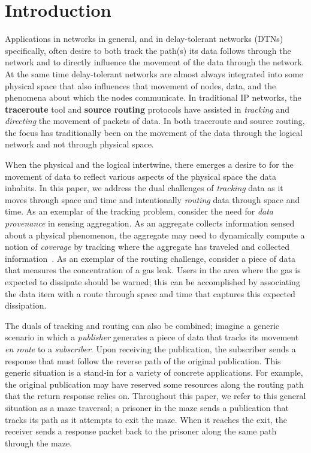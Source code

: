 %
%
\section{Introduction}
Applications in networks in general, and in delay-tolerant networks (DTNs) specifically, often desire to both track the path(s) its data follows through the network and to directly influence the movement of the data through the network. At the same time delay-tolerant networks are almost always integrated into some physical space that also influences that movement of nodes, data, and the phenomena about which the nodes communicate. In traditional IP networks, the {\bf traceroute} tool and {\bf source routing} protocols have assisted in {\em tracking} and {\em directing} the movement of packets of data. In both traceroute and source routing, the focus has traditionally been on the movement of the data through the logical network and not through physical space.

When the physical and the logical intertwine, there emerges a desire to for the movement of data to reflect various aspects of the physical space the data inhabits. In this paper, we address the dual challenges of {\em tracking} data as it moves through space and time and intentionally {\em routing} data through space and time. As an exemplar of the tracking problem, consider the need for {\em data provenance} in sensing aggregation. As an aggregate collects information sensed about a physical phenomenon, the aggregate may need to dynamically compute a notion of {\em coverage} by tracking where the aggregate has traveled and collected information~\cite{michel12:spatiotemporal}. As an exemplar of the routing challenge, consider a piece of data that measures the concentration of a gas leak. Users in the area where the gas is expected to dissipate should be warned; this can be accomplished by associating the data item with a route through space and time that captures this expected dissipation. 

The duals of tracking and routing can also be combined; imagine a generic scenario in which a {\em publisher} generates a piece of data that tracks its movement {\em en route} to a {\em subscriber}. Upon receiving the publication, the subscriber sends a response that must follow the reverse path of the original publication. This generic situation is a stand-in for a variety of concrete applications. For example, the original publication may have reserved some resources along the routing path that the return response relies on. Throughout this paper, we refer to this general situation as a maze traversal; a prisoner in the maze sends a publication that tracks its path as it attempts to exit the maze. When it reaches the exit, the receiver sends a response packet back to the prisoner along the same path through the maze.

